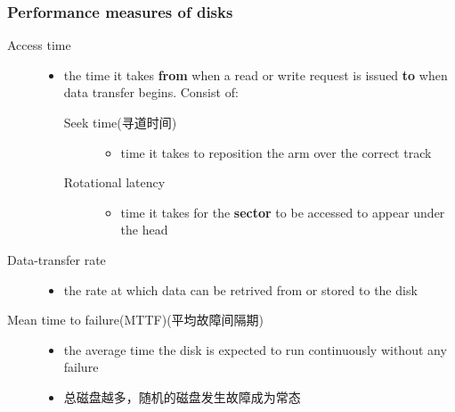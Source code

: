 \documentclass[11pt]{article}
\begin{document}
\subsubsection{Performance measures of disks}
\label{sec-14-2-2}
\begin{description}
\item[{Access time}] \begin{itemize}
\item the time it takes \textbf{from} when a read or write request is issued \textbf{to} when
data transfer begins. Consist of:
\begin{description}
\item[{Seek time(寻道时间)}] \begin{itemize}
\item time it takes to reposition the arm over the correct track
\end{itemize}
\item[{Rotational latency}] \begin{itemize}
\item time it takes for the \textbf{sector} to be accessed to appear under the head
\end{itemize}
\end{description}
\end{itemize}
\item[{Data-transfer rate}] \begin{itemize}
\item the rate at which data can be retrived from or stored to the disk
\end{itemize}
\item[{Mean time to failure(MTTF)(平均故障间隔期)}] \begin{itemize}
\item the average time the disk is expected to run continuously without any
failure
\item 总磁盘越多，随机的磁盘发生故障成为常态
\end{itemize}
\end{description}
\end{document}
